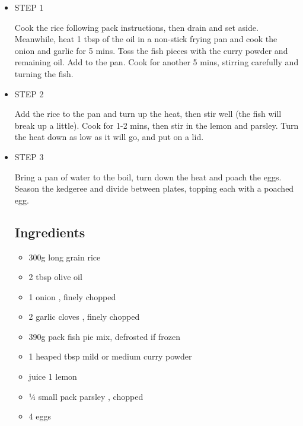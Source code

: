 \documentclass{article}
\begin{document}
\begin{itemize}
\item STEP 1


Cook the rice following pack instructions, then drain and set aside. Meanwhile, heat 1 tbsp of the oil in a non-stick frying pan and cook the onion and garlic for 5 mins. Toss the fish pieces with the curry powder and remaining oil. Add to the pan. Cook for another 5 mins, stirring carefully and turning the fish.


\item STEP 2


Add the rice to the pan and turn up the heat, then stir well (the fish will break up a little). Cook for 1-2 mins, then stir in the lemon and parsley. Turn the heat down as low as it will go, and put on a lid.


\item STEP 3


Bring a pan of water to the boil, turn down the heat and poach the eggs. Season the kedgeree and divide between plates, topping each with a poached egg.


\subsection{Ingredients}\label{H5790041}


\begin{itemize}
\item 300g long grain rice


\item 2 tbsp olive oil


\item 1 onion , finely chopped


\item 2 garlic cloves , finely chopped


\item 390g pack fish pie mix, defrosted if frozen


\item 1 heaped tbsp mild or medium curry powder


\item juice 1 lemon


\item ¼ small pack parsley , chopped


\item 4 eggs


\end{itemize}

\end{itemize}

\autocite{gesis-ssoar-28542}


\printbibliography[title={Bibliography}]
\end{document}
